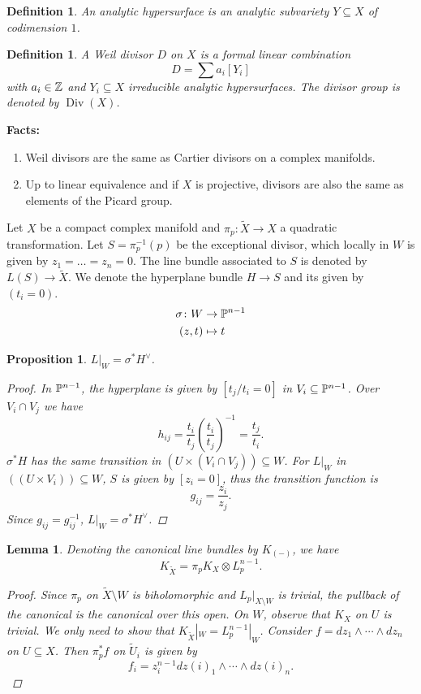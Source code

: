 \documentclass[A4paper, british]{amsart}
\theoremstyle{darkgreentheorem}
\newtheorem{lm}[thm]{Lemma}
\newtheorem{prop}[thm]{Proposition}
\theoremstyle{darkbluedefinition}
\newtheorem{defn}[thm]{Definition}
\theoremstyle{darkredexample}
\theoremstyle{remark}
\DeclareMathOperator{\Div}{Div}
\newcommand{\1}{\mathbbm{1}}
\newcommand{\ot}{\otimes}
\newcommand{\dual}{^{\vee}}
\newcommand{\tms}{\times}
\newcommand{\sub}{\subseteq}
\begin{document}
\begin{defn}
    An \textit{analytic hypersurface} is an analytic subvariety $Y\sub X$ of codimension $1$.
\end{defn}

\begin{defn}
    A \textit{Weil divisor} $D$ on $X$ is a formal linear combination
    \[ D=\sum a_{i}[Y_{i}] \]
    with $a_{i}\in \Z$ and $Y_{i}\sub X$ irreducible analytic hypersurfaces.
    The divisor group is denoted by $\Div(X)$.
\end{defn}

\textbf{Facts:}
\begin{enumerate}
    \item Weil divisors are the same as Cartier divisors on a complex manifolds.
    \item Up to linear equivalence and if $X$ is projective, divisors are also the same as elements of the Picard group.
\end{enumerate}

Let $X$ be a compact complex manifold and $\pi_{p}\colon \tilde{X}\to X$ a quadratic transformation.
Let $S=\pi_{p}^{-1}(p)$ be the exceptional divisor, which locally in $W$ is given by $z_{1}=\ldots =z_{n}=0$.
The line bundle associated to $S$ is denoted by $L(S)\to \tilde{X}$.
We denote the hyperplane bundle $H\to S$ and its given by $(t_{i}=0)$.
\begin{align*}
    \sigma \colon W & \to \P^{n-1} \\
    (z,t) & \mapsto t
\end{align*}

\begin{prop}
    $L|_{W}=\sigma^{*}H\dual$.
    \begin{proof}
	In $\P^{n-1}$, the hyperplane is given by $[t_{j}/t_{i}=0]$ in $V_{i}\sub \P^{n-1}$.
	Over $V_{i}\cap V_{j}$ we have
	\[ h_{ij}=\frac{t_{i}}{t_{j}}\left(\frac{t_{i}}{t_{j}}\right)^{-1}=\frac{t_{j}}{t_{i}}.\]
	$\sigma^{*}H$ has the same transition in $(U\tms (V_{i}\cap V_{j}))\sub W$.
	For $L|_{W}$ in $((U\tms V_{i}))\sub W$, $S$ is given by $[z_{i}=0]$, thus the transition function is
	\[ g_{ij}=\frac{z_{i}}{z_{j}}. \]
	Since $g_{ij}=g_{ij}^{-1}$, $L|_{W}=\sigma^{*}H\dual $.
    \end{proof}
\end{prop}

\begin{lm}
    Denoting the canonical line bundles by $K_{(-)}$, we have
    \[ K_{\tilde{X}}=\pi_{p}K_{X}\ot L_{p}^{n-1}. \]
    \begin{proof}
	Since $\pi_{p}$ on $\tilde{X}\setminus W$ is biholomorphic and $L_{p}|_{X\setminus W}$ is trivial, the pullback of the canonical is the canonical over this open.
	On $W$, observe that $K_{X}$ on $U$ is trivial.
	We only need to show that $K_{\tilde{X}}|_{W}=L_{p}^{n-1}|_{W}$.
	Consider $f=dz_{1}\wedge \cdots \wedge dz_{n}$ on $U\sub X$.
	Then $\pi_{p}^{*}f$ on $\tilde{U}_{i}$ is given by
	\[ f_{i}=z_{i}^{n-1}dz(i)_{1}\wedge \cdots \wedge dz(i)_{n}.\]
    \end{proof}
\end{lm}
\end{document}

